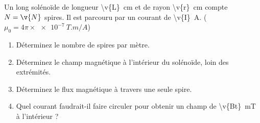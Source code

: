 Un long solénoïde de longueur \qty{\v{L}}{cm} et de rayon \qty{\v{r}}{cm} compte $N = \v{N}$ spires. Il est parcouru par un courant de \qty{\v{I}}{A}. ($\mu_0 = 4\pi \times \qty{e-7}{T.m/A}$)

\begin{enumerate}[label=\alph*)]
    \item Déterminez le nombre de spires par mètre.
    \item Déterminez le champ magnétique à l'intérieur du solénoïde, loin des extrémités.
    \item Déterminez le flux magnétique à travers une seule spire.
    \item Quel courant faudrait-il faire circuler pour obtenir un champ de \qty{\v{Bt}}{mT} à l'intérieur ?
\end{enumerate}
